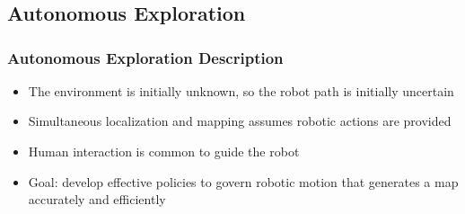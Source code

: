\documentclass[11pt,professionalfonts,hyperref={pdftex,pdfpagemode=none,pdfstartview=FitH}]{beamer}
\renewcommand{\emph}[1]{\textit{\textbf{\color{blue}{#1}}}}
\begin{document}
\begin{frame}
\end{frame}


\section*{}
\subsection*{Autonomous Exploration}


\begin{frame}
\frametitle{Autonomous Exploration Description}
\begin{itemize}
        \item The environment is initially unknown, so the robot path is initially uncertain
	\item Simultaneous localization and mapping assumes robotic actions are provided
	\item Human interaction is common to guide the robot
	\item Goal: develop effective policies to govern robotic motion that generates a map accurately and efficiently
\end{itemize}

\end{frame}
\end{document}

